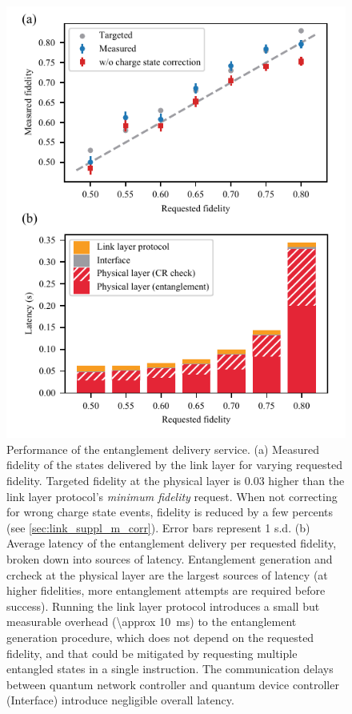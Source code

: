 \begin{figure}
    \centering
    \includegraphics[width=0.6\linewidth]{figures/latencyvsfid.pdf}
    \caption{
        Performance of the entanglement delivery service.
        (a) Measured fidelity of the states delivered by the link layer for varying requested
        fidelity. Targeted fidelity at the physical layer is 0.03 higher than the link layer
        protocol's \emph{minimum fidelity} request. When not correcting for wrong charge state
        events, fidelity is reduced by a few percents (see \cref{sec:link_suppl_m_corr}). Error bars
        represent \num{1} s.d.
        (b) Average latency of the entanglement delivery per requested fidelity, broken down into
        sources of latency. Entanglement generation and \acrlong{crcheck} at the physical layer are
        the largest sources of latency (at higher fidelities, more entanglement attempts are
        required before success). Running the link layer protocol introduces a small but measurable
        overhead (\qty{\approx 10}{ms}) to the entanglement generation procedure, which does not
        depend on the requested fidelity, and that could be mitigated by requesting multiple
        entangled states in a single instruction. The communication delays between quantum network
        controller and quantum device controller (Interface) introduce negligible overall latency.
    }
    \label{fig:latencyvsfid}
\end{figure}


